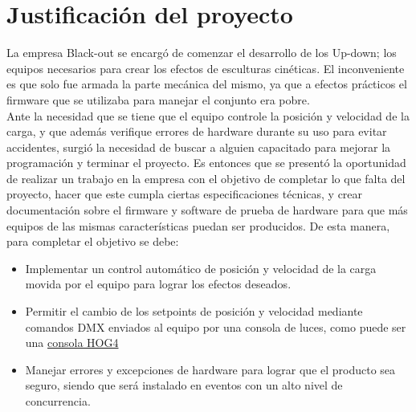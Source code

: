 \newpage
\section{Justificación del proyecto}
La empresa Black-out se encargó de comenzar el desarrollo de los Up-down; los equipos necesarios para crear los efectos de esculturas cinéticas. El inconveniente es que solo fue armada la parte mecánica del mismo, ya que a efectos prácticos el firmware que se utilizaba para manejar el conjunto era pobre.\\
Ante la necesidad que se tiene que el equipo controle la posición y velocidad de la carga, y que además verifique errores de hardware durante su uso para evitar accidentes, surgió la necesidad de buscar a alguien capacitado para mejorar la programación y terminar el proyecto.
Es entonces que se presentó la oportunidad de realizar un trabajo en la empresa con el objetivo de completar lo que falta del proyecto, hacer que este cumpla ciertas especificaciones técnicas, y crear documentación sobre el firmware y software de prueba de hardware para que más equipos de las mismas características puedan ser producidos. De esta manera, para completar el objetivo se debe:
\begin{itemize}
	\item Implementar un control automático de posición y velocidad de la carga movida por el equipo para lograr los efectos deseados.
	\item Permitir el cambio de los setpoints de posición y velocidad mediante comandos DMX enviados al equipo por una consola de luces, como puede ser una \href{https://www2.highend.com/products/controllers/Hog4Console.asp}{consola HOG4}
	\item Manejar errores y excepciones de hardware para lograr que el producto sea seguro, siendo que será instalado en eventos con un alto nivel de concurrencia.
\end{itemize}




